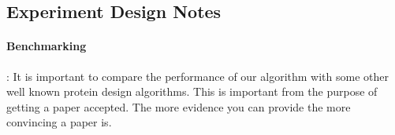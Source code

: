 \documentclass{article}
\begin{document}
\subsection{Experiment Design Notes}

\paragraph{Benchmarking} : It is important to compare the performance of our algorithm with some other well known protein design algorithms. This is important from the purpose of getting a paper accepted. The more evidence you can provide the more convincing a paper is. 
\end{document}
